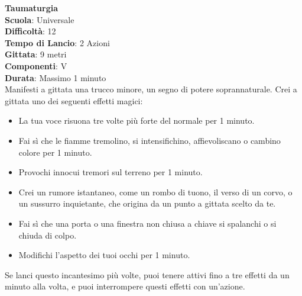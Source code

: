 \begin{multicols}{2}
\medskip\textbf{Taumaturgia}\\
\textbf{Scuola}: Universale\\
\textbf{Difficoltà}: 12\\
\textbf{Tempo di Lancio}: 2 Azioni\\
\textbf{Gittata}: 9 metri\\
\textbf{Componenti}: V\\
\textbf{Durata}: Massimo 1 minuto\\
Manifesti a gittata una trucco minore, un segno di potere soprannaturale. Crei a gittata uno dei seguenti effetti magici:
\medskip
\begin{itemize}
\item
La tua voce risuona tre volte più forte del normale per 1 minuto.
\item
Fai sì che le fiamme tremolino, si intensifichino, affievoliscano o cambino colore per 1 minuto.
\item
Provochi innocui tremori sul terreno per 1 minuto. 
\item
Crei un rumore istantaneo, come un rombo di tuono, il verso di un corvo, o un sussurro inquietante, che origina da un punto a gittata scelto da te.
\item
Fai sì che una porta o una finestra non chiusa a chiave si spalanchi o si chiuda di colpo.
\item
Modifichi l'aspetto dei tuoi occhi per 1 minuto.
\end{itemize}
\medskip
Se lanci questo incantesimo più volte, puoi tenere attivi fino a tre effetti da un minuto alla volta, e puoi interrompere questi effetti con un'azione.


\end{multicols}
